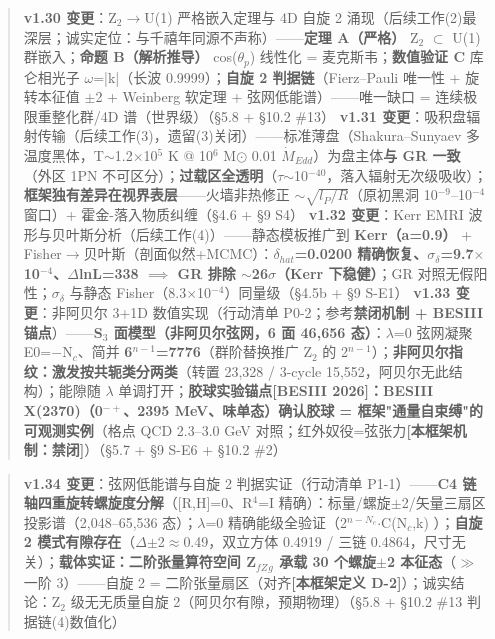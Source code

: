 \documentclass[12pt]{article}
\newcommand{\mtag}[1]{\textbf{[#1]}}
\newcommand{\up}[1]{\ensuremath{^{#1}}}
\newcommand{\down}[1]{\ensuremath{_{#1}}}
\begin{document}
\begin{quote}
\textbf{v1.30 变更}：Z\down{2}\ensuremath{\to}U(1) 严格嵌入定理与 4D 自旋 2 涌现（后续工作(2)最深层；诚实定位：与千禧年同源不声称）------\textbf{定理 A（严格）} Z\down{2} \ensuremath{\subset} U(1) 群嵌入；\textbf{命题 B（解析推导）} cos(\ensuremath{\theta}\down{p}) 线性化 = 麦克斯韦；\textbf{数值验证 C} 库仑相光子 \ensuremath{\omega}=|k|（长波 0.9999）；\textbf{自旋 2 判据链}（Fierz--Pauli 唯一性 + 旋转本征值 \ensuremath{\pm}2 + Weinberg 软定理 + 弦网低能谱）------唯一缺口 = 连续极限重整化群/4D 谱（世界级）（\S{}5.8 + \S{}10.2 \#13）
\textbf{v1.31 变更}：吸积盘辐射传输（后续工作(3)，遗留(3)关闭）------标准薄盘（Shakura--Sunyaev 多温度黑体，T\ensuremath{\sim}1.2\ensuremath{\times}10\up{5} K @ 10\up{6} M\ensuremath{\odot} 0.01 \ensuremath{\dot{M}}\down{Edd}）为盘主体\textbf{与 GR 一致}（外区 1PN 不可区分）；\textbf{过载区全透明}（\ensuremath{\tau}\ensuremath{\sim}10\up{-40}，落入辐射无次级吸收）；\textbf{框架独有差异在视界表层}------火墙非热修正 \ensuremath{\sim}\ensuremath{\sqrt{l\down{P}/R}}（原初黑洞 10\up{-9}--10\up{-4} 窗口）+ 霍金-落入物质纠缠（\S{}4.6 + \S{}9 S4）
\textbf{v1.32 变更}：Kerr EMRI 波形与贝叶斯分析（后续工作(4)）------静态模板推广到 \textbf{Kerr（a=0.9）} + Fisher\ensuremath{\to}贝叶斯（剖面似然+MCMC）：\textbf{\ensuremath{\delta}\down{hat}=0.0200 精确恢复、\ensuremath{\sigma}\down{\delta{}}=9.7\ensuremath{\times}10\up{-4}、\ensuremath{\Delta}lnL=338 \ensuremath{\implies} GR 排除 \ensuremath{\sim}26\ensuremath{\sigma}（Kerr 下稳健）}；GR 对照无假阳性；\ensuremath{\sigma}\down{\delta{}} 与静态 Fisher（8.3\ensuremath{\times}10\up{-4}）同量级（\S{}4.5b + \S{}9 S-E1）
\textbf{v1.33 变更}：非阿贝尔 3+1D 数值实现（行动清单 P0-2；参考\textbf{禁闭机制 + BESIII 锚点}）------\textbf{S\down{3} 面模型（非阿贝尔弦网，6 面 46,656 态）}：\ensuremath{\lambda}=0 弦网凝聚 E0=\ensuremath{-}N\down{c}、简并 \textbf{6\up{n-1}=7776}（群阶替换推广 Z\down{2} 的 2\up{n-1}）；\textbf{非阿贝尔指纹：激发按共轭类分两类}（转置 23,328 / 3-cycle 15,552，阿贝尔无此结构）；能隙随 \ensuremath{\lambda} 单调打开；\textbf{胶球实验锚点[BESIII 2026]：BESIII X(2370)（0\up{-+}、2395 MeV、味单态）确认胶球 = 框架"通量自束缚"的可观测实例}（格点 QCD 2.3--3.0 GeV 对照；红外奴役=弦张力\mtag{本框架机制：禁闭}）（\S{}5.7 + \S{}9 S-E6 + \S{}10.2 \#2）
\end{quote}

\begin{quote}
\textbf{v1.34 变更}：弦网低能谱与自旋 2 判据实证（行动清单 P1-1）------\textbf{C4 链轴四重旋转螺旋度分解}（[R,H]=0、R\up{4}=I 精确）：标量/螺旋\ensuremath{\pm}2/矢量三扇区投影谱（2,048--65,536 态）；\ensuremath{\lambda}=0 精确能级全验证（2\up{n-N\down{c}}\ensuremath{\cdot}C(N\down{c},k) \checkmark）；\textbf{自旋 2 模式有隙存在}（\ensuremath{\Delta}\ensuremath{\pm}2\ensuremath{\approx}0.49，双立方体 0.4919 / 三链 0.4864，尺寸无关）；\textbf{载体实证：二阶张量算符空间 Z\down{fZ}\down{g} 承载 30 个螺旋\ensuremath{\pm}2 本征态}（\ensuremath{\gg}一阶 3）------自旋 2 = 二阶张量扇区（对齐\mtag{本框架定义 D-2}）；诚实结论：Z\down{2} 级无无质量自旋 2（阿贝尔有隙，预期物理）（\S{}5.8 + \S{}10.2 \#13 判据链(4)数值化）
\end{quote}
\end{document}
